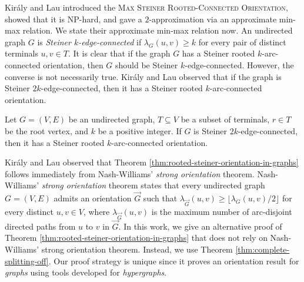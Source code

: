 Kir\'{a}ly and Lau \cite{Kiraly-Lau} introduced the \textsc{Max Steiner Rooted-Connected Orientation}, showed that it is NP-hard, and gave a $2$-approximation via an approximate min-max relation. We state their approximate min-max relation now. 
An undirected graph $G$ is \emph{Steiner $k$-edge-connected} if $\lambda_G(u,v)\ge k$ 
for every pair of distinct terminals $u, v\in T$. 
It is clear that if the graph $G$ has a Steiner rooted $k$-arc-connected orientation, then $G$ should be Steiner $k$-edge-connected. However, the converse is not necessarily true. Kir\'{a}ly and Lau observed that if the graph is Steiner $2k$-edge-connected, then it has a Steiner rooted $k$-arc-connected orientation. 

\begin{theorem}\label{thm:rooted-steiner-orientation-in-graphs}
Let $G=(V, E)$ be an undirected graph, $T\subseteq V$ be a subset of terminals, $r\in T$ be the root vertex, and $k$ be a positive integer. If $G$ is Steiner $2k$-edge-connected, then it has a Steiner rooted $k$-arc-connected orientation. 
\end{theorem}

Kir\'{a}ly and Lau observed that Theorem \ref{thm:rooted-steiner-orientation-in-graphs} follows immediately from Nash-Williams' \emph{strong orientation} theorem. 
Nash-Williams' \emph{strong orientation} theorem \cite{NW60} states that every undirected graph $G=(V, E)$ admits an orientation $\overrightarrow{G}$ such that $\lambda_{\overrightarrow{G}}(u,v)\ge \lfloor \lambda_G(u,v)/2\rfloor$ for every distinct $u, v\in V$, where $\lambda_{\overrightarrow{G}}(u,v)$ is the maximum number of arc-disjoint directed paths from $u$ to $v$ in $\overrightarrow{G}$. 
In this work, we give an alternative proof of Theorem \ref{thm:rooted-steiner-orientation-in-graphs} that does not rely on Nash-Williams' strong orientation theorem. Instead, we use Theorem \ref{thm:complete-splitting-off}. 
Our proof strategy is unique since it proves an orientation result for \emph{graphs} using tools developed for \emph{hypergraphs}. 

